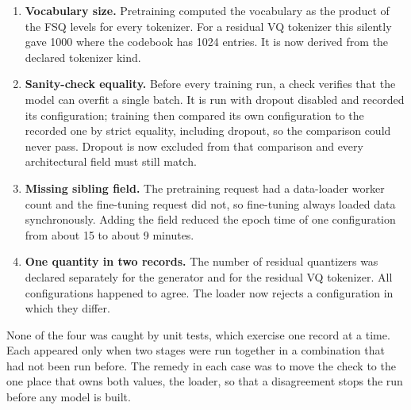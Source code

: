 \begin{enumerate}
\item \textbf{Vocabulary size.} Pretraining computed the vocabulary as the product of the FSQ levels for every tokenizer. For a residual VQ tokenizer this silently gave 1000 where the codebook has 1024 entries. It is now derived from the declared tokenizer kind.
\item \textbf{Sanity-check equality.} Before every training run, a check verifies that the model can overfit a single batch. It is run with dropout disabled and recorded its configuration; training then compared its own configuration to the recorded one by strict equality, including dropout, so the comparison could never pass. Dropout is now excluded from that comparison and every architectural field must still match.
\item \textbf{Missing sibling field.} The pretraining request had a data-loader worker count and the fine-tuning request did not, so fine-tuning always loaded data synchronously. Adding the field reduced the epoch time of one configuration from about 15 to about 9 minutes.
\item \textbf{One quantity in two records.} The number of residual quantizers was declared separately for the generator and for the residual VQ tokenizer. All configurations happened to agree. The loader now rejects a configuration in which they differ.
\end{enumerate}

None of the four was caught by unit tests, which exercise one record at a time. Each appeared only when two stages were run together in a combination that had not been run before. The remedy in each case was to move the check to the one place that owns both values, the loader, so that a disagreement stops the run before any model is built.
